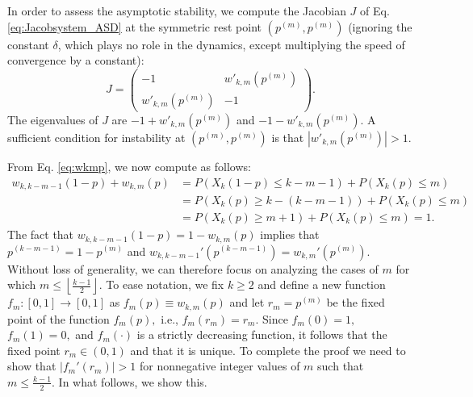\documentclass[12pt]{article}
\numberwithin{equation}{section}
\numberwithin{figure}{section}
\theoremstyle{definition}
\theoremstyle{plain}
\theoremstyle{plain}
\theoremstyle{plain}
\theoremstyle{remark}
\theoremstyle{plain}
\theoremstyle{plain}
\begin{document}
In order to assess the asymptotic stability, we compute the Jacobian $J$ of 
Eq. \eqref{eq:Jacobsystem_ASD} at the symmetric rest point $(p^{(m)}, p^{(m)})$ 
(ignoring the constant $\delta$, which plays no role in the dynamics, except multiplying the speed of convergence by a constant): 
$$
J =  \left( \begin{array}{cc}
-1 & w'_{k,m}(p^{(m)})  \\
w'_{k,m}(p^{(m)}) & -1  \end{array} \right).
$$
The eigenvalues of $J$ are $-1+w'_{k,m}(p^{(m)})$ and $-1-w'_{k,m}(p^{(m)}).$ A sufficient condition for instability at $(p^{(m)}, p^{(m)})$ is that $|w'_{k,m}(p^{(m)})| > 1.$ 

From Eq. \eqref{eq:wkmp}, we now compute as follows:
\begin{align*}
    w_{k,k-m-1}(1-p)+w_{k,m}(p) &= P(X_k(1-p) \leq k-m-1) + P(X_k(p) \leq m)\\
    &= P(X_k(p) \geq k-(k-m-1)) + P(X_k(p) \leq m) \\
    &= P(X_k(p) \geq m+1) + P(X_k(p) \leq m) = 1.
\end{align*}
The fact that  $ w_{k,k-m-1}(1-p)=1-w_{k,m}(p)$ implies that $p^{(k-m-1)} = 1 - p^{(m)}$ and $w_{k,k-m-1}'(p^{(k-m-1)}) = w_{k,m}'(p^{(m)}).$ Without loss of generality, we can therefore focus on analyzing the cases of $m$ for which $m \leq \left\lfloor \frac{k-1}{2}\right\rfloor.$ To ease notation, we fix $k\geq 2$ and define a new function $f_m:[0,1] \rightarrow [0,1]$ as $f_m(p) \equiv w_{k,m}(p)$ and let $r_m = p^{(m)}$ be the fixed point of the function $f_m(p),$ i.e., $f_m(r_m) = r_m.$ Since $f_m(0) = 1,$ $f_m(1) = 0,$ and $f_m(\cdot)$ is a strictly decreasing function, it follows that the fixed point $r_m \in (0,1)$ and that it is unique. 
To complete the proof we need to show that $|f_m'(r_m)| > 1$ for nonnegative integer values of $m$ such that $m \leq \frac{k-1}{2}.$ In what follows, we show this. 
\end{document}
